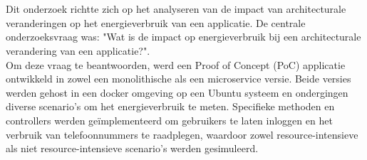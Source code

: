 
%
%
%
%
%

%



\chapter*{}
Dit onderzoek richtte zich op het analyseren van de impact van architecturale veranderingen op het energieverbruik van een applicatie. De centrale onderzoeksvraag was: "Wat is de impact op energieverbruik bij een architecturale verandering van een applicatie?".\\

Om deze vraag te beantwoorden, werd een Proof of Concept (PoC) applicatie ontwikkeld in zowel een monolithische als een microservice versie. Beide versies werden gehost in een docker omgeving op een Ubuntu systeem en ondergingen diverse scenario's om het energieverbruik te meten. Specifieke methoden en controllers werden geïmplementeerd om gebruikers te laten inloggen en het verbruik van telefoonnummers te raadplegen, waardoor zowel resource-intensieve als niet resource-intensieve scenario’s werden gesimuleerd.\\

